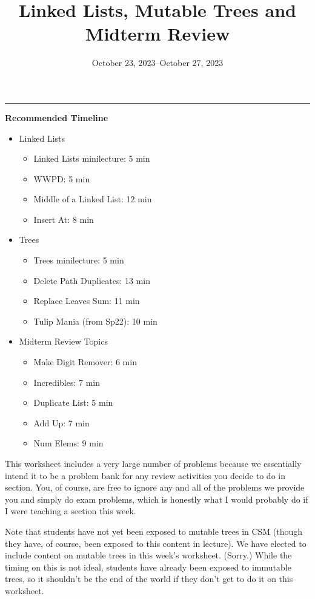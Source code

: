 \documentclass{exam}
\title{Linked Lists, Mutable Trees and Midterm Review}
\date{October 23, 2023--October 27, 2023}
\begin{document}
\maketitle
\rule{\textwidth}{0.15em}

\begin{meta}
    \textbf{Recommended Timeline}
    \begin{itemize}
        \item Linked Lists
        \begin{itemize}
            \item Linked Lists minilecture: 5 min
            \item WWPD: 5 min
            \item Middle of a Linked List: 12 min
            \item Insert At: 8 min
        \end{itemize}
        \item Trees
        \begin{itemize}
            \item Trees minilecture: 5 min
            \item Delete Path Duplicates: 13 min
            \item Replace Leaves Sum: 11 min
            \item Tulip Mania (from Sp22): 10 min
        \end{itemize}
        \item Midterm Review Topics
        \begin{itemize}
            \item Make Digit Remover: 6 min
            \item Incredibles: 7 min
            \item Duplicate List: 5 min
            \item Add Up: 7 min
            \item Num Elems: 9 min
        \end{itemize}
    \end{itemize}
    This worksheet includes a very large number of problems because we essentially intend it to be a problem bank for any review activities you decide to do in section. You, of course, are free to ignore any and all of the problems we provide you and simply do exam problems, which is honestly what I would probably do if I were teaching a section this week. 

    Note that students have not yet been exposed to mutable trees in CSM (though they have, of course, been exposed to this content in lecture). We have elected to include content on mutable trees in this week's worksheet. (Sorry.) While the timing on this is not ideal, students have already been exposed to immutable trees, so it shouldn't be the end of the world if they don't get to do it on this worksheet.


\end{meta}
\end{document}
